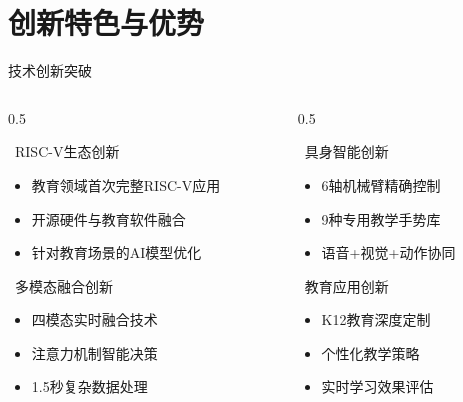 \documentclass[aspectratio=169,12pt]{beamer}
\begin{document}
\section{创新特色与优势}

\begin{frame}{技术创新突破}
    \begin{columns}
        \begin{column}{0.5\textwidth}
            \begin{block}{\faRocket\ RISC-V生态创新}
                \begin{itemize}
                    \item 教育领域首次完整RISC-V应用
                    \item 开源硬件与教育软件融合
                    \item 针对教育场景的AI模型优化
                \end{itemize}
            \end{block}
            
            \begin{block}{\faBrain\ 多模态融合创新}
                \begin{itemize}
                    \item 四模态实时融合技术
                    \item 注意力机制智能决策
                    \item 1.5秒复杂数据处理
                \end{itemize}
            \end{block}
        \end{column}
        \begin{column}{0.5\textwidth}
            \begin{block}{\faRobot\ 具身智能创新}
                \begin{itemize}
                    \item 6轴机械臂精确控制
                    \item 9种专用教学手势库
                    \item 语音+视觉+动作协同
                \end{itemize}
            \end{block}
            
            \begin{block}{\faGraduationCap\ 教育应用创新}
                \begin{itemize}
                    \item K12教育深度定制
                    \item 个性化教学策略
                    \item 实时学习效果评估
                \end{itemize}
            \end{block}
        \end{column}
    \end{columns}
\end{frame}
\end{document}
